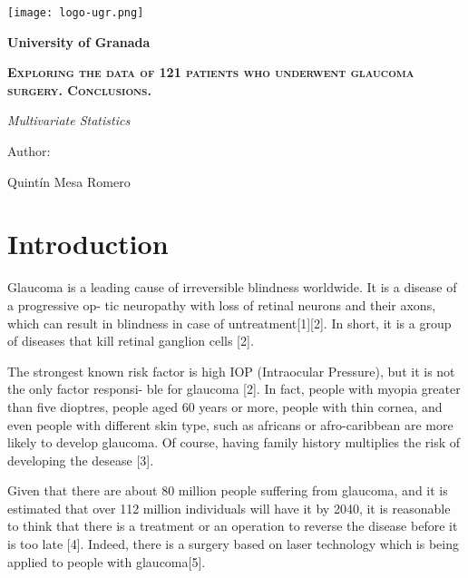 \documentclass{article}
\begin{document}
\begin{titlepage}
\centering
\vspace{1cm}
{\texttt{[image: logo-ugr.png]}\par}
\vspace{1cm}
{\bfseries\LARGE University of Granada \par}
\vspace{1cm}
{\scshape\Huge \textbf{Exploring the data of 121 patients who underwent glaucoma surgery. Conclusions.}  \par}
\vspace{1cm}
{\itshape\Large Multivariate Statistics \par}
\vspace{1.2cm}
{\Large Author:\par}

Quintín Mesa Romero \par

\end{titlepage}


\section{Introduction}


Glaucoma is a leading cause of irreversible blindness worldwide. It is a disease of a progressive op-
tic neuropathy with loss of retinal neurons and their axons, which can result in blindness in case of
untreatment[1][2]. In short, it is a group of diseases that kill retinal ganglion cells [2].

The strongest known risk factor is high IOP (Intraocular Pressure), but it is not the only factor responsi-
ble for glaucoma [2]. In fact, people with myopia greater than five dioptres, people aged 60 years or more,
people with thin cornea, and even people with different skin type, such as africans or afro-caribbean are
more likely to develop glaucoma. Of course, having family history multiplies the risk of developing the
desease [3].

Given that there are about 80 million people suffering from glaucoma, and it is estimated that over 112
million individuals will have it by 2040, it is reasonable to think that there is a treatment or an operation
to reverse the disease before it is too late [4]. Indeed, there is a surgery based on laser technology which is 
being applied to people with glaucoma[5]. 
\end{document}
